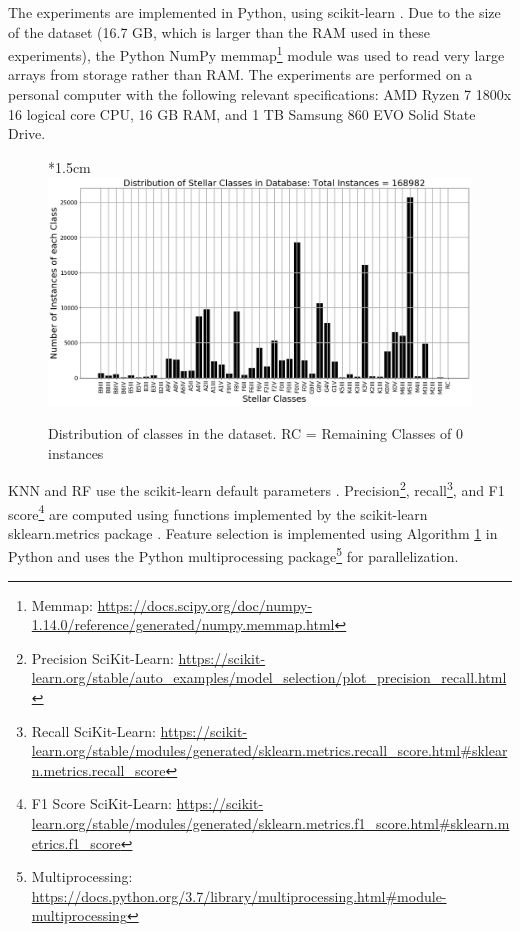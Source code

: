 \documentclass[trackchanges, floatfix, twocolumn, tighten]{aastex62}
\begin{document}
\newpage %
\vspace*{1.5cm} %
The experiments are implemented in Python, using scikit-learn \citep{scikit-learn}. Due to the size of the  dataset (16.7 GB, which is larger than the RAM used in these experiments), the Python NumPy memmap\footnote{Memmap: \url{https://docs.scipy.org/doc/numpy-1.14.0/reference/generated/numpy.memmap.html}} \citep{numpy} module was used to read very large arrays from storage rather than RAM. The experiments are performed on a personal computer with the following relevant specifications: AMD Ryzen 7 1800x 16 logical core CPU, 16 GB RAM, and 1 TB Samsung 860 EVO Solid State Drive. 


        \begin{figure}
	  
*{1.5cm} %
            \centering
            \includegraphics[width=1\linewidth]{figures/Distribution_B.png}
            \caption{Distribution of classes in the dataset. RC = Remaining Classes of 0 instances}
            \label{fig:dist_B}
        \end{figure}

\newpage %
KNN and RF use the scikit-learn default parameters \citep{scikit-learn}. Precision\footnote{Precision SciKit-Learn: \url{https://scikit-learn.org/stable/auto_examples/model_selection/plot_precision_recall.html}}, recall\footnote{Recall SciKit-Learn: \url{https://scikit-learn.org/stable/modules/generated/sklearn.metrics.recall_score.html\#sklearn.metrics.recall_score}}, and F1 score\footnote{F1 Score SciKit-Learn: \url{https://scikit-learn.org/stable/modules/generated/sklearn.metrics.f1_score.html\#sklearn.metrics.f1_score}} are computed using functions implemented by the scikit-learn sklearn.metrics package \citep{scikit-learn}. Feature selection is implemented using Algorithm \hyperlink{alg:FS}{1} in Python and uses the Python multiprocessing package\footnote{Multiprocessing: \url{https://docs.python.org/3.7/library/multiprocessing.html\#module-multiprocessing}} for parallelization. 
\end{document}
